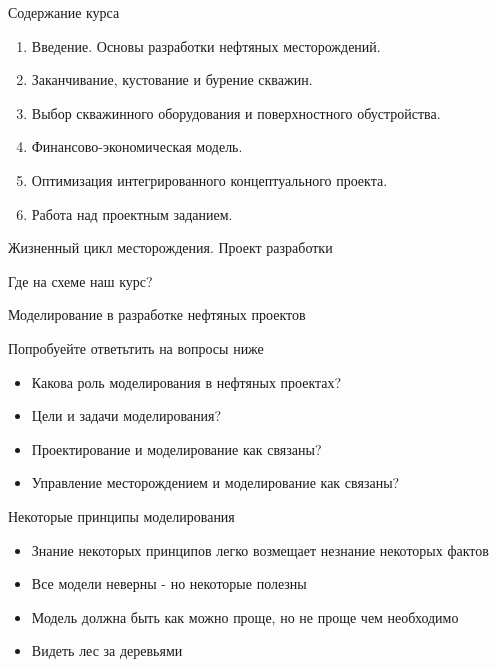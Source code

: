 \begin{frame}{Содержание курса}
\begin{enumerate}
    \item Введение. Основы разработки нефтяных месторождений.
    \item Заканчивание, кустование и бурение скважин.
    \item Выбор скважинного оборудования и поверхностного обустройства.
    \item Финансово-экономическая модель.
    \item Оптимизация интегрированного концептуального проекта. 
    \item Работа над проектным заданием.
\end{enumerate}
\end{frame}

%
\begin{frame}{Жизненный цикл месторождения. Проект разработки}


\begin{center}
Где на схеме наш курс?    
\end{center}


\end{frame}

\begin{frame}{Моделирование в разработке нефтяных проектов}
\begin{center}
    Попробуейте ответьтить на вопросы ниже
\end{center}
\begin{itemize}
    \item Какова роль моделирования в нефтяных проектах? 
    \item Цели и задачи моделирования?
    \item Проектирование и моделирование как связаны?
    \item Управление месторождением и моделирование как связаны?
\end{itemize}
 
\end{frame}

\begin{frame}{Некоторые принципы моделирования}
    \begin{itemize}
        \item Знание некоторых принципов легко возмещает незнание некоторых фактов
        \item Все модели неверны - но некоторые полезны
        \item Модель должна быть как можно проще, но не проще чем необходимо
        \item Видеть лес за деревьями 
    \end{itemize}
\end{frame}

